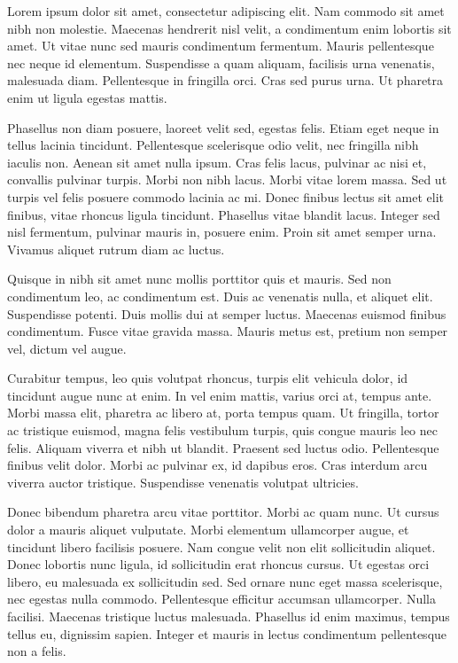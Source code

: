 \documentclass[
  letterpaper,
  oneside]{scrbook}
\begin{document}
Lorem ipsum dolor sit amet, consectetur adipiscing elit. Nam commodo sit
amet nibh non molestie. Maecenas hendrerit nisl velit, a condimentum
enim lobortis sit amet. Ut vitae nunc sed mauris condimentum fermentum.
Mauris pellentesque nec neque id elementum. Suspendisse a quam aliquam,
facilisis urna venenatis, malesuada diam. Pellentesque in fringilla
orci. Cras sed purus urna. Ut pharetra enim ut ligula egestas mattis.

Phasellus non diam posuere, laoreet velit sed, egestas felis. Etiam eget
neque in tellus lacinia tincidunt. Pellentesque scelerisque odio velit,
nec fringilla nibh iaculis non. Aenean sit amet nulla ipsum. Cras felis
lacus, pulvinar ac nisi et, convallis pulvinar turpis. Morbi non nibh
lacus. Morbi vitae lorem massa. Sed ut turpis vel felis posuere commodo
lacinia ac mi. Donec finibus lectus sit amet elit finibus, vitae rhoncus
ligula tincidunt. Phasellus vitae blandit lacus. Integer sed nisl
fermentum, pulvinar mauris in, posuere enim. Proin sit amet semper urna.
Vivamus aliquet rutrum diam ac luctus.

Quisque in nibh sit amet nunc mollis porttitor quis et mauris. Sed non
condimentum leo, ac condimentum est. Duis ac venenatis nulla, et aliquet
elit. Suspendisse potenti. Duis mollis dui at semper luctus. Maecenas
euismod finibus condimentum. Fusce vitae gravida massa. Mauris metus
est, pretium non semper vel, dictum vel augue.

Curabitur tempus, leo quis volutpat rhoncus, turpis elit vehicula dolor,
id tincidunt augue nunc at enim. In vel enim mattis, varius orci at,
tempus ante. Morbi massa elit, pharetra ac libero at, porta tempus quam.
Ut fringilla, tortor ac tristique euismod, magna felis vestibulum
turpis, quis congue mauris leo nec felis. Aliquam viverra et nibh ut
blandit. Praesent sed luctus odio. Pellentesque finibus velit dolor.
Morbi ac pulvinar ex, id dapibus eros. Cras interdum arcu viverra auctor
tristique. Suspendisse venenatis volutpat ultricies.

Donec bibendum pharetra arcu vitae porttitor. Morbi ac quam nunc. Ut
cursus dolor a mauris aliquet vulputate. Morbi elementum ullamcorper
augue, et tincidunt libero facilisis posuere. Nam congue velit non elit
sollicitudin aliquet. Donec lobortis nunc ligula, id sollicitudin erat
rhoncus cursus. Ut egestas orci libero, eu malesuada ex sollicitudin
sed. Sed ornare nunc eget massa scelerisque, nec egestas nulla commodo.
Pellentesque efficitur accumsan ullamcorper. Nulla facilisi. Maecenas
tristique luctus malesuada. Phasellus id enim maximus, tempus tellus eu,
dignissim sapien. Integer et mauris in lectus condimentum pellentesque
non a felis.
\end{document}
